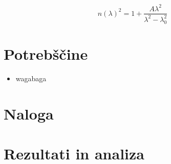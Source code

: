\documentclass[12pt]{article}
\begin{document}
\begin{equation}
    n(\lambda)^2 = 1 + \frac{A\lambda ^2}{\lambda ^2-\lambda_0^2}
    \label{Seill}
\end{equation}

\section{Potrebščine}
\begin{itemize}
    \item wagabaga
\end{itemize}

\section{Naloga}


\section{Rezultati in analiza}
\end{document}
